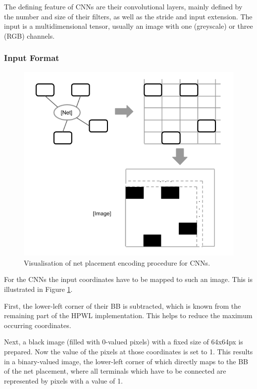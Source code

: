 The defining feature of \glspl{CNN} are their convolutional layers, mainly defined by the number and size of their filters, as well as the stride and input extension. The input is a multidimensional tensor, usually an image with one (greyscale) or three (RGB) channels.

\subsubsection{Input Format}

\begin{figure}
	\includegraphics[width=\linewidth]{plots/cnn-encoding-proper.png}
	\caption{Visualisation of net placement encoding procedure for \glspl{CNN}.}
	\label{fig:cnn-encoding}
\end{figure}

For the \glspl{CNN} the input coordinates have to be mapped to such an image. This is illustrated in Figure \ref{fig:cnn-encoding}.

First, the lower-left corner of their \gls{BB} is subtracted, which is known from the remaining part of the \gls{HPWL} implementation. This helps to reduce the maximum occurring coordinates.

Next, a black image (filled with 0-valued pixels) with a fixed size of 64x64px is prepared. Now the value of the pixels at those coordinates is set to 1. This results in a binary-valued image, the lower-left corner of which directly maps to the \gls{BB} of the net placement, where all terminals which have to be connected are represented by pixels with a value of 1.


